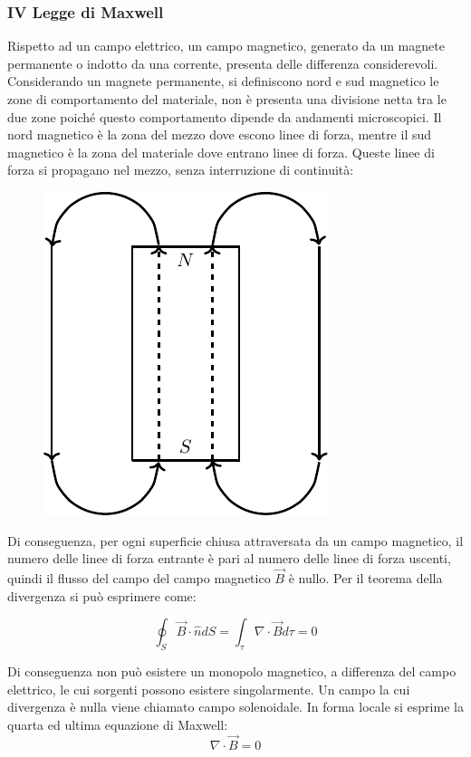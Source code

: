 \documentclass{article}
\numberwithin{equation}{subsection}
\begin{document}
\subsubsection{IV Legge di Maxwell}

Rispetto ad un campo elettrico, un campo magnetico, generato da un magnete permanente o indotto da una corrente, presenta delle differenza considerevoli. Considerando un 
magnete permanente, si definiscono nord e sud magnetico le zone di comportamento del materiale, non è presenta una divisione netta tra le due zone poiché questo comportamento 
dipende da andamenti microscopici. Il nord magnetico è la zona del mezzo dove escono linee di forza, mentre il 
sud magnetico è la zona del materiale dove entrano linee di forza. Queste linee di forza si propagano nel mezzo, senza interruzione di continuità:

\begin{figure}[H]%
    \centering
    \includegraphics{quarta-legge-maxwell.pdf}
    \label{fig:quarta-legge-maxwell}
\end{figure}

Di conseguenza, per ogni superficie chiusa attraversata da un campo magnetico, il numero delle linee di forza entrante è pari al numero delle linee di forza uscenti, quindi 
il flusso del campo del campo magnetico $\vec{B}$ è nullo. Per il teorema della divergenza si può esprimere come:

\begin{equation}
    \displaystyle\oint_{S}\vec{B}\cdot\hat{n}dS=\int_{\tau}\nabla\cdot\vec{B}d\tau=0
\end{equation}

Di conseguenza non può esistere un monopolo magnetico, a differenza del campo elettrico, le cui sorgenti possono esistere singolarmente. Un campo la cui divergenza è nulla 
viene chiamato campo solenoidale. In forma locale si esprime la quarta ed ultima equazione di Maxwell:
\begin{equation}
    \nabla\cdot\vec{B}=0
\end{equation}
\end{document}
